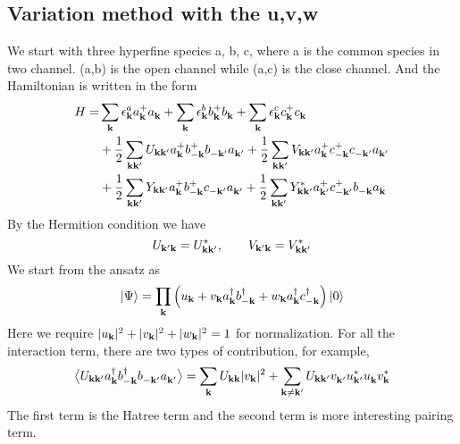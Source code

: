 \subsection{Variation method with the u,v,w\label{sec:variation}}
We start with three hyperfine species a, b, c, where a is the common species in two channel. (a,b) is the open channel while (a,c) is the close channel. And the Hamiltonian is written in the form 
\begin{equation}\label{eq:uvw:hamiltonian}
\begin{split}
 H=&\sum_\vk\epsilon^a_\vk{}a^+_\vk{}a^{}_\vk+\sum_\vk\epsilon^b_\vk{}b^+_\vk{}b^{}_\vk+\sum_\vk\epsilon^c_\vk{}c^+_\vk{}c^{}_\vk\\
  &+\nth{2}\sum_{\vk\vk'}U_{\vk\vk'}a^+_\vk{}b^+_{-\vk}{}b^{}_{-\vk'}a^{}_{\vk'}
	+\nth{2}\sum_{\vk\vk'}V_{\vk\vk'}a^+_\vk{}c^+_{-\vk}{}c^{}_{-\vk'}a^{}_{\vk'}\\
 &+\nth{2}\sum_{\vk\vk'}Y_{\vk\vk'}a^+_\vk{}b^+_{-\vk}{}c^{}_{-\vk'}a^{}_{\vk'}
	+\nth{2}\sum_{\vk\vk'}Y^*_{\vk\vk'}a^+_{\vk'}{}c^+_{-\vk'}{}b^{}_{-\vk}a^{}_{\vk}
\end{split} 
\end{equation}
By the Hermition condition we have 
\begin{equation}
 U_{\vk'\vk}=U^*_{\vk\vk'},\qquad{} V_{\vk'\vk}=V^*_{\vk\vk'}
\end{equation}
  We start from the ansatz as 
\begin{equation}\label{eq:ansatz}
 \ket{\Psi}=\prod_\vk\br{u_\vk+v_\vk{}a^\dg_\vk{}b^\dg_{-\vk}+w_\vk{}a^\dg_\vk{}c^\dg_{-\vk}}\ket{0}
\end{equation}
Here we require $\abs{u_\vk}^2+\abs{v_\vk}^2+\abs{w_\vk}^2=1$ for normalization.  For all the interaction term, there are two types of contribution,
for example, 
\begin{equation*}
\av{U_{\vk\vk'}a^\dg_\vk{}b^\dg_{-\vk}{}b^{}_{-\vk'}a^{}_{\vk'}}
=\sum_{\vk}U_{\vk\vk}\abs{v_\vk}^2+\sum_{\vk\neq\vk'}U_{\vk\vk'}v^{}_{\vk'}u^*_{\vk'}u^{}_\vk{}v^*_\vk
\end{equation*}
The first term is the Hatree term and the second term is more interesting pairing term.




